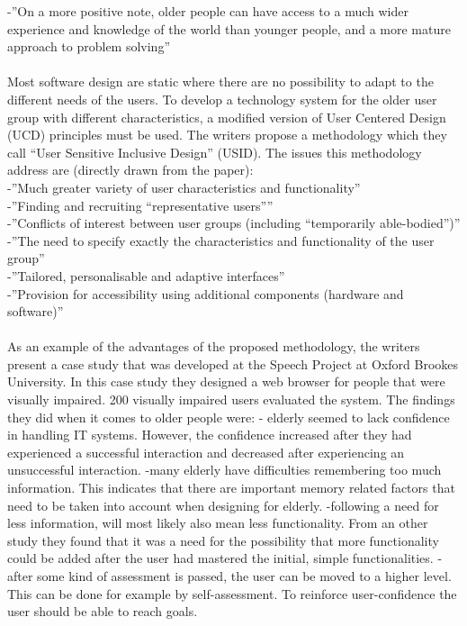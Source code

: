-”On a more positive note, older people can have access to a much wider experience and knowledge of the world than younger people, and a more mature approach to problem solving”\\ \\
Most software design are static where there are no possibility to adapt to the different needs of the users. To develop a technology system for the older user group with different characteristics, a modified version of User Centered Design (UCD) principles must be used. The writers propose a methodology which they call “User Sensitive Inclusive Design” (USID). The issues this methodology address are (directly drawn from the paper): \\
-”Much greater variety of user characteristics and functionality” \\
-”Finding and recruiting “representative users”” \\
-”Conflicts of interest between user groups (including “temporarily able-bodied”)” \\
-”The need to specify exactly the characteristics and functionality of the user group” \\
-”Tailored, personalisable and adaptive interfaces” \\
-”Provision for accessibility using additional components (hardware and software)”\\ \\
As an example of the advantages of the proposed methodology, the writers present a case study that was developed at the Speech Project at Oxford Brookes University. In this case study they designed a web browser for people that were visually impaired. 200 visually impaired users evaluated the system.  The findings they did when it comes to older people were:
- elderly seemed to lack confidence in handling IT systems. However, the confidence increased after they had experienced a successful interaction and decreased after experiencing an unsuccessful interaction.
-many elderly have difficulties remembering too much information. This indicates that there are important memory related factors that need to be taken into account when designing for elderly. 
-following a need for less information, will most likely also mean less functionality. From an other study they found that it was a need for the possibility that more functionality could be added after the user had mastered the initial, simple functionalities. 
-after some kind of assessment is passed, the user can be moved to a higher level. This can be done for example by self-assessment. To reinforce user-confidence the user should be able to reach goals.
